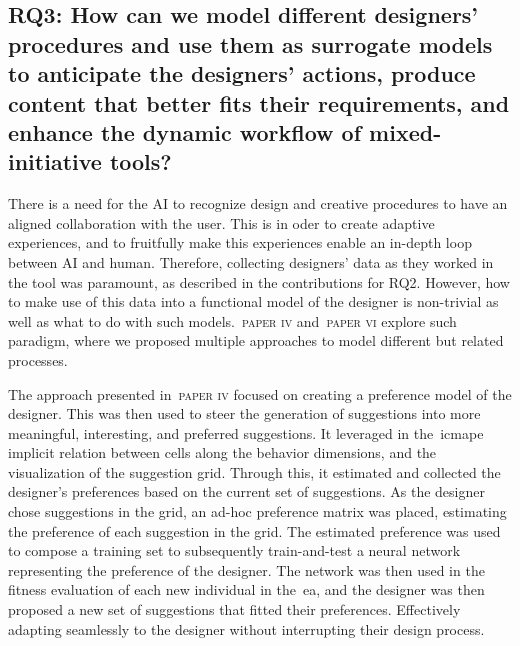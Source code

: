








\subsection[Research Question 3]{RQ3: How can we model different designers' procedures and use them as surrogate models to anticipate the designers' actions, produce content that better fits their requirements, and enhance the dynamic workflow of mixed-initiative tools?}

There is a need for the AI to recognize design and creative procedures to have an aligned collaboration with the user. This is in oder to create adaptive experiences, and to fruitfully make this experiences enable an in-depth loop between AI and human. Therefore, collecting designers' data as they worked in the tool was paramount, as described in the contributions for RQ2. However, how to make use of this data into a functional model of the designer is non-trivial as well as what to do with such models.~\textsc{paper iv} and~\textsc{paper vi} explore such paradigm, where we proposed multiple approaches to model different but related processes. 

The approach presented in~\textsc{paper iv} focused on creating a preference model of the designer. This was then used to steer the generation of suggestions into more meaningful, interesting, and preferred suggestions. It leveraged in the~\acrshort{icmape} implicit relation between cells along the behavior dimensions, and the visualization of the suggestion grid. Through this, it estimated and collected the designer's preferences based on the current set of suggestions. As the designer chose suggestions in the grid, an ad-hoc preference matrix was placed, estimating the preference of each suggestion in the grid. The estimated preference was used to compose a training set to subsequently train-and-test a neural network representing the preference of the designer. The network was then used in the fitness evaluation of each new individual in the~\acrshort{ea}, and the designer was then proposed a new set of suggestions that fitted their preferences. Effectively adapting seamlessly to the designer without interrupting their design process.

